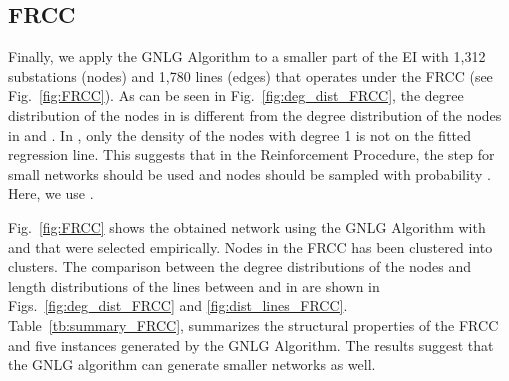 \documentclass[10pt,journal]{IEEEtran}
\begin{document}
\subsection{FRCC}\label{subsec:FRCC}
Finally, we apply the GNLG Algorithm to a smaller part of the EI with  1,312 substations (nodes) and 1,780 lines (edges) that operates under the FRCC (see Fig.~\ref{fig:FRCC}).  As can be seen in Fig.~\ref{fig:deg_dist_FRCC}, the degree distribution of the nodes in  is different from the degree distribution of the nodes in  and . In , only the density of the nodes with degree 1 is not on the fitted regression line. This suggests that in the Reinforcement Procedure, the step for small networks should be used and nodes should be sampled with probability . Here, we use .


Fig.~\ref{fig:FRCC} shows the obtained network using the GNLG Algorithm with  and  that were selected empirically. Nodes in the FRCC has been clustered into  clusters. The comparison between the degree distributions of the nodes and length distributions of the lines between  and in  are shown in Figs.~\ref{fig:deg_dist_FRCC} and \ref{fig:dist_lines_FRCC}. Table~\ref{tb:summary_FRCC}, summarizes the structural properties of the FRCC and five instances generated by the GNLG Algorithm. The results suggest that the GNLG algorithm can generate smaller networks as well.
\end{document}
